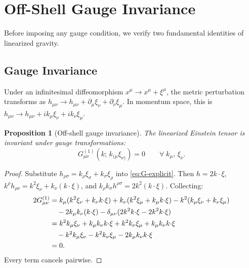 \documentclass[11pt,a4paper]{article}
\theoremstyle{plain}
\newtheorem{proposition}[theorem]{Proposition}
\theoremstyle{definition}
\begin{document}
\section{Off-Shell Gauge Invariance}\label{sec:gauge}

Before imposing any gauge condition, we verify two fundamental
identities of linearized gravity.

\subsection{Gauge Invariance}

Under an infinitesimal diffeomorphism $x^\mu \to x^\mu + \xi^\mu$,
the metric perturbation transforms as
$h_{\mu\nu} \to h_{\mu\nu} + \partial_\mu \xi_\nu + \partial_\nu \xi_\mu$.
In momentum space, this is $h_{\mu\nu} \to h_{\mu\nu}
+ ik_\mu \xi_\nu + ik_\nu \xi_\mu$.

\begin{proposition}[Off-shell gauge invariance]\label{prop:gauge}
The linearized Einstein tensor is invariant under gauge transformations:
\begin{equation}\label{eq:gauge-inv}
  G^{(1)}_{\mu\nu}(k;\, k_{(\mu}\xi_{\nu)}) = 0
  \qquad \forall\; k_\mu,\, \xi_\nu.
\end{equation}
\end{proposition}

\begin{proof}
Substitute $h_{\rho\sigma} = k_\rho \xi_\sigma + k_\sigma \xi_\rho$
into \cref{eq:G-explicit}. Then $h = 2k \cdot \xi$,
$k^\rho h_{\rho\nu} = k^2 \xi_\nu + k_\nu (k \cdot \xi)$,
and $k_\rho k_\sigma h^{\rho\sigma} = 2k^2(k \cdot \xi)$. Collecting:
\begin{align}
  2G^{(1)}_{\mu\nu} &= k_\mu(k^2\xi_\nu + k_\nu k{\cdot}\xi)
  + k_\nu(k^2\xi_\mu + k_\mu k{\cdot}\xi)
  - k^2(k_\mu\xi_\nu + k_\nu\xi_\mu)\notag\\
  &\quad - 2k_\mu k_\nu(k{\cdot}\xi)
  - \delta_{\mu\nu}(2k^2 k{\cdot}\xi - 2k^2 k{\cdot}\xi)\notag\\
  &= k^2 k_\mu\xi_\nu + k_\mu k_\nu k{\cdot}\xi
  + k^2 k_\nu\xi_\mu + k_\mu k_\nu k{\cdot}\xi\notag\\
  &\quad - k^2 k_\mu\xi_\nu - k^2 k_\nu\xi_\mu
  - 2k_\mu k_\nu k{\cdot}\xi\notag\\
  &= 0.
\end{align}
Every term cancels pairwise.
\end{proof}
\end{document}
